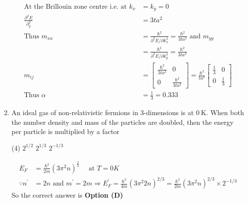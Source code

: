 \begin{enumerate}
\begin{answer}
\begin{align*}
\text{At the Brillouin zone centre i.e. at }k_{x}&=k_{y}=0\\
\frac{\partial^{2} E}{\partial_{y}^{2}}&=3 t a^{2}\\
\text{Thus }m_{x x}&=\frac{\hbar^{2}}{\partial^{2} E / \partial k_{x}^{2}}=\frac{\hbar^{2}}{3 t a^{2}}\text{ and }m_{y y}\\&=\frac{\hbar^{2}}{\partial^{2} E / \partial k_{y}^{2}}=\frac{\hbar^{2}}{3 t a^{2}}\\
m_{i j}&=\left[\begin{array}{cc}\frac{\hbar^{2}}{3 t a^{2}} & 0 \\ 0 & \frac{\hbar^{2}}{3 t a^{2}}\end{array}\right]=\frac{\hbar^{2}}{t a^{2}}\left[\begin{array}{cc}\frac{1}{3} & 0 \\ 0 & \frac{1}{3}\end{array}\right]\\
\text{Thus }\alpha&=\frac{1}{3}=0.333
\end{align*}
\end{answer}
\item An ideal gas of non-relativistic fermions in 3-dimensions is at $0 \mathrm{~K}$. When both the number density and mass of the particles are doubled, then the energy per particle is multiplied by a factor
{}
\begin{tasks}(4)
\task[\textbf{A.}]  $2^{1 / 2}$
\task[\textbf{C.}]  $2^{1 / 3}$
\task[\textbf{D.}] $2^{-1 / 3}$
\end{tasks}
\begin{answer}
\begin{align*}
E_{F}&=\frac{\hbar^{2}}{2 m}\left(3 \pi^{2} n\right)^{\frac{2}{3}} \quad\text{ at }T=0 K\\
\because n^{\prime}&=2 n\text{ and }m^{\prime}=2 m \Rightarrow E_{F}^{\prime}=\frac{\hbar^{2}}{4 m}\left(3 \pi^{2} 2 n\right)^{2 / 3}=\frac{\hbar^{2}}{2 m}\left(3 \pi^{2} n\right)^{2 / 3} \times 2^{-1 / 3}
\end{align*}
So the correct answer is \textbf{Option (D)}
\end{answer}
\end{enumerate}
\setlength\arrayrulewidth{1pt}

